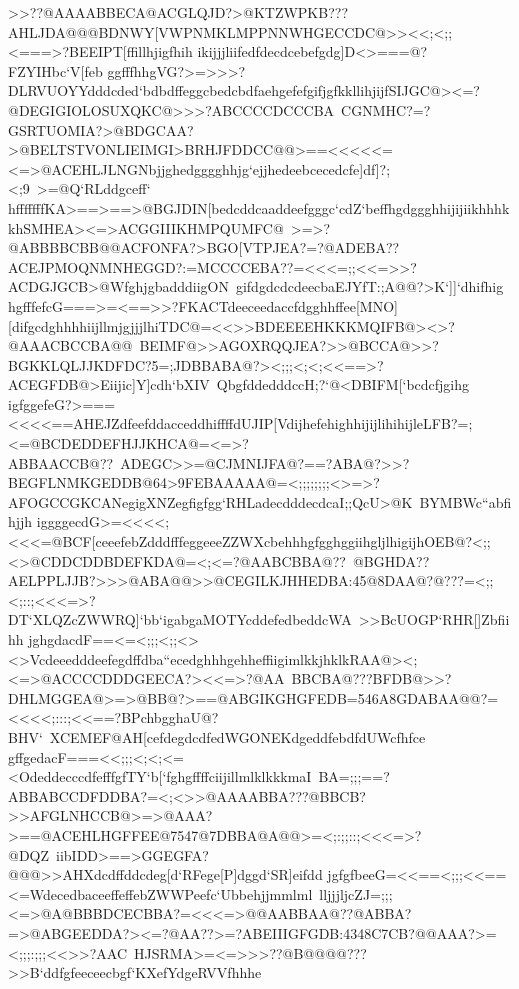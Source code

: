 {{{ >>??@AAAABBECA@ACGLQJD?>@KTZWPKB???AHLJDA@@@BDNWY[VWPNMKLMPPNNWHGECCDC@>><<;<;;<===>?BEEIPT[ffillhjigfhih%
 ikijjjliifedfdecdcebefgdg]D<>===@?FZYIHbc`V[feb}
 \hbox{ggfffhhgVG?>=>>>?DLRVUOYYdddcded`bdbdffeggcbedcbdfaehgefefgifjgfkkllihjijfSIJGC@><=?@DEGIGIOLOSUXQKC@>>>?ABCCCCDCCCBA%
 CGNMHC?=?GSRTUOMIA?>@BDGCAA?>@BELTSTVONLIEIMGI>BRHJFDDCC@@>==<<<<<=<=>@ACEHLJLNGNbjjghedgggghhjg`ejjhedeebcecedcfe]df]?;<;9%
 >=@Q`RLddgceff`}
 \hbox{hfffffffKA>==>==>@BGJDIN[bedcddcaaddeefgggc`cdZ`beffhgdggghhijijiikhhhkkhSMHEA><=>ACGGIIIKHMPQUMFC@%
 >=>?@ABBBBCBB@@ACFONFA?>BGO[VTPJEA?=?@ADEBA??ACEJPMOQNMNHEGGD?:=MCCCCEBA??=<<<=;;<<=>>?ACDGJGCB>@WfghjgbadddiigON%
 gifdgdcdcdeecbaEJYfT:;A@@?>K`]]`dhifhig}
 \hbox{hgfffefcG===>=<==>>?FKACTdeeceedaccfdgghhffee[MNO][difgcdghhhhiijllmjgjjjlhiTDC@=<<>>BDEEEEHKKKMQIFB@><>?@AAACBCCBA@@%
 BEIMF@>>AGOXRQQJEA?>>@BCCA@>>?BGKKLQLJJKDFDC?5=;JDBBABA@?><;;;<;<;<<==>?ACEGFDB@>Eiijic]Y]cdh`bXIV%
 QbgfddedddccH;?`@<DBIFM[`bcdcfjgihg}
 \hbox{igfggefeG?>===<<<<==AHEJZdfeefddacceddhiffffdUJIP[VdijhefehighhijijlihihijleLFB?=;<=@BCDEDDEFHJJKHCA@=<=>?ABBAACCB@??%
 ADEGC>>=@CJMNIJFA@?==?ABA@?>>?BEGFLNMKGEDDB@64>9FEBAAAAA@=<;;;;;;;;<>=>?AFOGCCGKCANegigXNZegfigfgg`RHLadecdddecdcaI;;QcU>@K%
 BYMBWc``abfihjjh}
 \hbox{iggggecdG>=<<<<;<<<=@BCF[ceeefebZdddfffeggeeeZZWXcbehhhgfgghggiihgljlhigijhOEB@?<;;<>@CDDCDDBDEFKDA@=<;<=?@AABCBBA@??%
 @BGHDA??AELPPLJJB?>>>@ABA@@>>@CEGILKJHHEDBA:45@8DAA@?@???=<;;<;::;<<<=>?DT`XLQZcZWWRQ]`bb`igabgaMOTYcddefedbeddcWA%
 >>BcUOGP`RHR[]Zbfiihh}
 \hbox{jghgdacdF==<=<;;;<;;<><>Vcdeeedddeefegdffdba``ecedghhhgehheffiigimlkkjhklkRAA@><;<=>@ACCCCDDDGEECA?><<=>?@AA%
 BBCBA@???BFDB@>>?DHLMGGEA@>=>@BB@?>==@ABGIKGHGFEDB=546A8GDABAA@@?=<<<<;:::;<<==?BPchbgghaU@?BHV`%
 XCEMEF@AH[cefdegdcdfedWGONEKdgeddfebdfdUWcfhfce}
 \hbox{gffgedacF===<<;;;<;<;<=<OdeddecccdfefffgfTY`b[`fghgffffciijillmlklkkkmaI%
 BA=;;;==?ABBABCCDFDDBA?=<;<>>@AAAABBA???@BBCB?>>AFGLNHCCB@>=>@AAA?>==@ACEHLHGFFEE@7547@7DBBA@A@@>=<;:;;::;<<<=>?@DQZ%
 iibIDD>==>GGEGFA?@@@>>AHXdcdffddcdeg[d`RFege[P]dggd`SR]eifdd}
 \hbox{jgfgfbeeG=<<==<;;;<<==<=WdecedbaceeffeffebZWWPeefc`Ubbehjjmmlml%
 lljjjljcZJ=;;;<=>@A@BBBDCECBBA?=<<<=>@@AABBAA@??@ABBA?=>@ABGEEDDA?><=?@AA??>=?ABEIIIGFGDB:4348C7CB?@@AAA?>=<;;;:;;;<<>>?AAC%
 HJSRMA>=<=>>>??@B@@@@???>>B`ddfgfeeceecbgf`KXefYdgeRVVfhhhe}
}}
